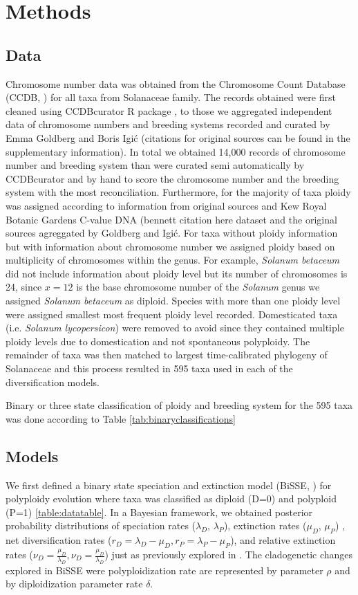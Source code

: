 \section{Methods}
\subsection{Data}
Chromosome number data was obtained from the Chromosome Count Database (CCDB, \citet{rice_2015}) for all taxa from Solanaceae family. The records obtained were first cleaned using CCDBcurator R package \citep{zenilferguson_2017}, to those we aggregated independent data of chromosome numbers and breeding systems recorded and curated by Emma Goldberg and Boris Igi\'c  (citations for original sources can be found in the supplementary information). In total we obtained 14,000 records of chromosome number and breeding system than were curated semi automatically by CCDBcurator and by hand to score the chromosome number and the breeding system with the most reconciliation. Furthermore, for the majority of taxa ploidy was assigned according to information from original sources and Kew Royal Botanic Gardens C-value DNA (bennett citation here dataset and the original sources agreggated by Goldberg and Igi\'c. For taxa without ploidy information but with information about chromosome number we assigned ploidy based on multiplicity of chromosomes within the genus. For example, \textit{Solanum betaceum} did not include information about ploidy level but its number of chromosomes is 24, since $x=12$ is the base chromosome number of the \textit{Solanum} genus we assigned  \textit{Solanum betaceum} as diploid. Species with more than one ploidy level were assigned smallest most frequent ploidy level recorded. Domesticated taxa (i.e. \textit{Solanum lycopersicon}) were removed to avoid since they contained multiple ploidy levels due to domestication and not spontaneous polyploidy. The remainder of taxa was then matched to largest time-calibrated  phylogeny of Solanaceae and this process resulted in 595 taxa used in each of the diversification models.

Binary or three state classification of ploidy and breeding system for the 595 taxa  was done according to Table \autoref{tab:binaryclassifications}
  
\subsection{Models}
We first defined a binary state speciation and extinction model (BiSSE, \citet{maddison_2007})  for polyploidy evolution where taxa was classified as diploid (D=0) and polyploid (P=1) \cref{table:datatable}. In  a Bayesian framework, we obtained posterior probability distributions of speciation rates ($\lambda_D$, $\lambda_P$), extinction rates ($\mu_D$, $\mu_P$) , net diversification rates ($r_D=\lambda_D-\mu_D, r_P=\lambda_P-\mu_P$), and  relative extinction rates ($\nu_D=\frac{\mu_D}{\lambda_D}, \nu_D=\frac{\mu_D}{\lambda_D}$) just as previously explored in \citet{mayrose_2011}. The cladogenetic changes explored in BiSSE were polyploidization rate are represented by parameter $\rho$ and by diploidization parameter rate $\delta$.\newline 

